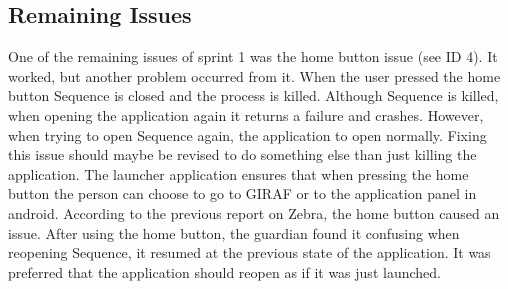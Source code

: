 \subsection{Remaining Issues}
One of the remaining issues of sprint 1 was the home button issue (see ID 4). It worked, but another problem occurred from it. 
When the user pressed the home button Sequence is closed and the process is killed. Although Sequence is killed, when opening the application again it returns a failure and crashes. However, when trying to open Sequence again, the application to open normally.
Fixing this issue should maybe be revised to do something else than just killing the application.
The launcher application ensures that when pressing the home button the person can choose to go to GIRAF or to the application panel in android.
According to the previous report on Zebra, \citep{Zebra} the home button caused an issue. After using the home button, the guardian found it confusing when reopening Sequence, it resumed at the previous state of the application. It was preferred that the application should reopen as if it was just launched.